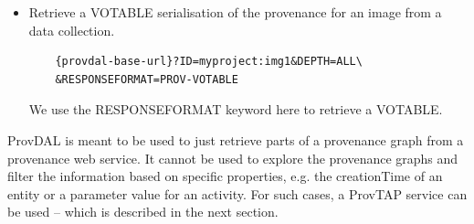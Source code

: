 \begin{itemize}
\item Retrieve a VOTABLE serialisation of the provenance for an image from a data collection.
	\begin{verbatim}
	{provdal-base-url}?ID=myproject:img1&DEPTH=ALL\
	&RESPONSEFORMAT=PROV-VOTABLE
	\end{verbatim}
	We use the RESPONSEFORMAT keyword here to retrieve a VOTABLE.
\end{itemize}

ProvDAL is meant to be used to just retrieve parts of a provenance graph from a provenance web service. It cannot be used to explore the provenance graphs and filter the information based on specific properties, e.g. the creationTime of an entity or a parameter value for an activity. For such cases, a ProvTAP service can be used -- which is described in the next section.


